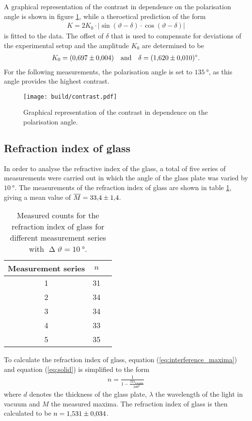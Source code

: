 \noindent
A graphical representation of the contrast in dependence on the polarisation angle is shown in figure \ref{fig:contrast}, while a theroetical prediction of the form
\begin{align}
    K = 2K_0\cdot|\sin(\vartheta-\delta)\cdot\cos(\vartheta-\delta)|
\end{align}
is fitted to the data.
The offset of $\delta$ that is used to compensate for deviations of the experimental setup and the amplitude $K_0$ are determined to be
\begin{align*}
    K_0=\SI{0.697\pm0.004}{} \quad \text{and} \quad \delta=\SI{1.620\pm0.010}{\degree}.
\end{align*}
For the following measurements, the polarisation angle is set to $\SI{135}{\degree}$, as this angle provides the highest contrast.
\begin{figure}[H]
    \centering
    \texttt{[image: build/contrast.pdf]}
    \caption{Graphical representation of the contrast in dependence on the polarisation angle.}
    \label{fig:contrast}
\end{figure}

\subsection{Refraction index of glass}
\label{subsec:refraction_glass}

In order to analyse the refractive index of the glass, a total of five series of measurements were carried out in which the angle of the glass plate was varied by $\SI{10}{\degree}$.
The measurements of the refraction index of glass are shown in table \ref{tab:refraction_glass}, giving a mean value of $\overline M=\num{33.4\pm1.4}$.
\begin{table}[H]
    \centering
    \begin{tabular}{c c c}
        \toprule
        Measurement series & $n$ \\
        \midrule
        1 & 31 \\
        2 & 34 \\
        3 & 34 \\
        4 & 33 \\
        5 & 35 \\
        \bottomrule
    \end{tabular}
    \caption{Measured counts for the refraction index of glass for different measurement series with $\upDelta \vartheta=\SI{10}{\degree}$.}
    \label{tab:refraction_glass}
\end{table}
\noindent
To calculate the refraction index of glass, equation (\ref{eq:interference_maxima}) and equation (\ref{eq:solid}) is simplified to the form
\begin{align}
    n = \frac{1}{1-\frac{M\lambda_{\text{vacuum}}}{2d\theta^2}}
\end{align}
where $d$ denotes the thickness of the glass plate, $\lambda$ the wavelength of the light in vacuum and $M$ the measured maxima.
The refraction index of glass is then calculated to be $n=\num{1.531 \pm 0.034}$.

